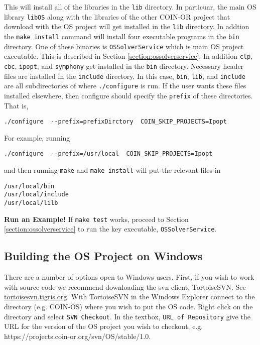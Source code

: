 \documentclass[11pt]{article}
\renewcommand{\_}{{\char"5F}}
\renewcommand{\{}{{\char"7B}}
\renewcommand{\}}{{\char"7D}}
\renewcommand{\^}{{\char"0D}}
\renewcommand{\'}{{\char"0D}}
\begin{document}
This will install all of the libraries in the {\tt lib} directory.  In particuar, the main OS library {\tt libOS} along with the libraries of the other COIN-OR project that download with the OS project will get installed in the {\tt lib} directory.  In addtion the {\tt make install} command will install four executable programs in the {\tt bin} directory.  One of these binaries is {\tt OSSolverService} which is main OS project executable. This is described in Section \ref{section:ossolverservice}. In addition {\tt clp}, {\tt cbc}, {\tt ipopt}, and {\tt symphony} get installed  in the {\tt bin} directory.  Necessary header files are installed in the {\tt include} directory.   In this case, {\tt bin}, {\tt lib}, and {\tt include} are all subdirectories of where {\tt ./configure} is run.   If the user wants these files installed elsewhere, then configure should specify the {\tt prefix} of these directories.  That is,


\begin{verbatim}
./configure  --prefix=prefixDirctory  COIN_SKIP_PROJECTS=Ipopt
\end{verbatim}

For example, running

\begin{verbatim}
./configure  --prefix=/usr/local  COIN_SKIP_PROJECTS=Ipopt
\end{verbatim}

\noindent and then running {\tt make} and {\tt make install} will put the relevant files in

\begin{verbatim}
/usr/local/bin
/usr/local/include
/usr/local/lilb
\end{verbatim}

\vskip 8pt

{\bf Run an Example!}  If {\tt make test} works, proceed to Section \ref{section:ossolverservice} to run the key executable, {\tt OSSolverService}.







\subsection{Building the OS Project on Windows}\label{section:windowsintall}

There are a number of options open to Windows users.   First, if you wish to work with source code we recommend downloading  the svn client,  TortoiseSVN.  See \url{tortoisesvn.tigris.org}.  With TortoiseSVN in the Windows Explorer connect to the directory (e.g. COIN-OS) where you wish to put the OS code. Right click on the directory and select {\tt SVN Checkout}.   In the textbox, {\tt URL of Repository} give the URL for the version of the OS project you wish to checkout, e.g. https://projects.coin-or.org/svn/OS/stable/1.0.
\end{document}
